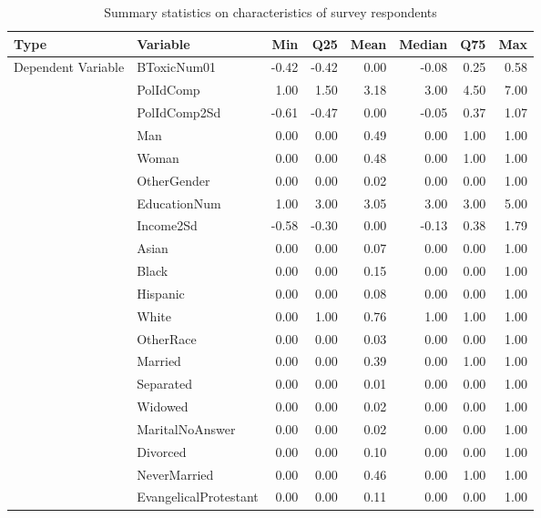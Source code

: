 \begin{table}[!h]
\centering
\caption{\label{tab:summ-tab1}Summary statistics on characteristics of survey respondents}
\centering
\begin{tabular}[t]{llrrrrrr}
\toprule
Type & Variable & Min & Q25 & Mean & Median & Q75 & Max\\
\midrule
Dependent Variable & BToxicNum01 & -0.42 & -0.42 & 0.00 & -0.08 & 0.25 & 0.58\\
\cmidrule{1-8}
 & PolIdComp & 1.00 & 1.50 & 3.18 & 3.00 & 4.50 & 7.00\\
\cmidrule{2-8}
 & PolIdComp2Sd & -0.61 & -0.47 & 0.00 & -0.05 & 0.37 & 1.07\\
\cmidrule{2-8}
 & Man & 0.00 & 0.00 & 0.49 & 0.00 & 1.00 & 1.00\\
\cmidrule{2-8}
 & Woman & 0.00 & 0.00 & 0.48 & 0.00 & 1.00 & 1.00\\
\cmidrule{2-8}
 & OtherGender & 0.00 & 0.00 & 0.02 & 0.00 & 0.00 & 1.00\\
\cmidrule{2-8}
 & EducationNum & 1.00 & 3.00 & 3.05 & 3.00 & 3.00 & 5.00\\
\cmidrule{2-8}
 & Income2Sd & -0.58 & -0.30 & 0.00 & -0.13 & 0.38 & 1.79\\
\cmidrule{2-8}
 & Asian & 0.00 & 0.00 & 0.07 & 0.00 & 0.00 & 1.00\\
\cmidrule{2-8}
 & Black & 0.00 & 0.00 & 0.15 & 0.00 & 0.00 & 1.00\\
\cmidrule{2-8}
 & Hispanic & 0.00 & 0.00 & 0.08 & 0.00 & 0.00 & 1.00\\
\cmidrule{2-8}
 & White & 0.00 & 1.00 & 0.76 & 1.00 & 1.00 & 1.00\\
\cmidrule{2-8}
 & OtherRace & 0.00 & 0.00 & 0.03 & 0.00 & 0.00 & 1.00\\
\cmidrule{2-8}
 & Married & 0.00 & 0.00 & 0.39 & 0.00 & 1.00 & 1.00\\
\cmidrule{2-8}
 & Separated & 0.00 & 0.00 & 0.01 & 0.00 & 0.00 & 1.00\\
\cmidrule{2-8}
 & Widowed & 0.00 & 0.00 & 0.02 & 0.00 & 0.00 & 1.00\\
\cmidrule{2-8}
 & MaritalNoAnswer & 0.00 & 0.00 & 0.02 & 0.00 & 0.00 & 1.00\\
\cmidrule{2-8}
 & Divorced & 0.00 & 0.00 & 0.10 & 0.00 & 0.00 & 1.00\\
\cmidrule{2-8}
 & NeverMarried & 0.00 & 0.00 & 0.46 & 0.00 & 1.00 & 1.00\\
\cmidrule{2-8}
 & EvangelicalProtestant & 0.00 & 0.00 & 0.11 & 0.00 & 0.00 & 1.00\\

\end{tabular}
\end{table}

